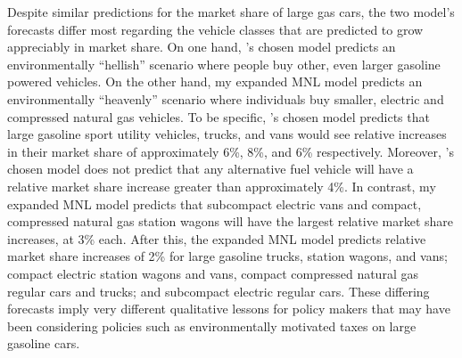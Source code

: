 \documentclass[preprint]{elsarticle}
\begin{document}
Despite similar predictions for the market share of large gas cars, the two model's forecasts differ most regarding the vehicle classes that are predicted to grow appreciably in market share. On one hand, \citeauthor{brownstone_forecasting_1998}'s chosen model predicts an environmentally ``hellish'' scenario where people buy other, even larger gasoline powered vehicles. On the other hand, my expanded MNL model predicts an environmentally ``heavenly'' scenario where individuals buy smaller, electric and compressed natural gas vehicles. To be specific, \citeauthor{brownstone_forecasting_1998}'s chosen model predicts that large gasoline sport utility vehicles, trucks, and vans would see relative increases in their market share of approximately 6\%, 8\%, and 6\% respectively. Moreover, \citeauthor{brownstone_forecasting_1998}'s chosen model does not predict that any alternative fuel vehicle will have a relative market share increase greater than approximately 4\%. In contrast, my expanded MNL model predicts that subcompact electric vans and compact, compressed natural gas station wagons will have the largest relative market share increases, at 3\% each. After this, the expanded MNL model predicts relative market share increases of 2\% for  large gasoline trucks, station wagons, and vans; compact electric station wagons and vans, compact compressed natural gas regular cars and trucks; and subcompact electric regular cars. These differing forecasts imply very different qualitative lessons for policy makers that may have been considering policies such as environmentally motivated taxes on large gasoline cars.
\end{document}
